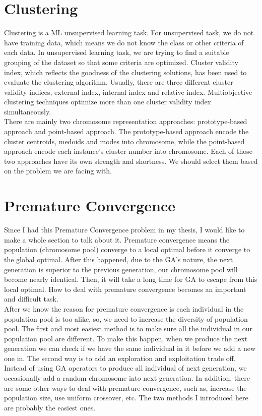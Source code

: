 \documentclass{article}
\begin{document}
\section{Clustering}
Clustering is a ML unsupervised learning task. For unsupervised task, we do not have training data, which means we do not know the class or other criteria of each data. In unsupervised learning task, we are trying to find a suitable grouping of the dataset so that some criteria are optimized. Cluster validity index, which reflects the goodness of the clustering solutions, has been used to evaluate the clustering algorithm. Usually, there are three different cluster validity indices, external index, internal index and relative index. Multiobjective clustering techniques optimize more than one cluster validity index simultaneously.\cite{survey2} \\

There are mainly two chromosome representation approaches: prototype-based approach and point-based approach. The prototype-based approach encode the cluster centroids, medoids and modes into chromosome, while the point-based approach encode each instance’s cluster number into chromosome. Each of those two approaches have its own strength and shortness. We should select them based on the problem we are facing with.

\section{Premature Convergence}
Since I had this Premature Convergence problem in my thesis, I would like to make a whole section to talk about it. Premature convergence means the population (chromosome pool) converge to a local optimal before it converge to the global optimal. After this happened, due to the GA's nature, the next generation is superior to the previous generation, our chromosome pool will become nearly identical. Then, it will take a long time for GA to escape from this local optimal. How to deal with premature convergence becomes an important and difficult task. \cite{diversity} \\

After we know the reason for premature convergence is each individual in the population pool is too alike, so, we need to increase the diversity of population pool. The first and most easiest method is to make sure all the individual in our population pool are different. To make this happen, when we produce the next generation we can check if we have the same individual in it before we add a new one in. The second way is to add an exploration and exploitation trade off. Instead of using GA operators to produce all individual of next generation, we occasionally add a random chromosome into next generation. In addition, there are some other ways to deal with premature convergence, such as, increase the population size, use uniform crossover, etc. The two methods I introduced here are probably the easiest ones.
\end{document}
